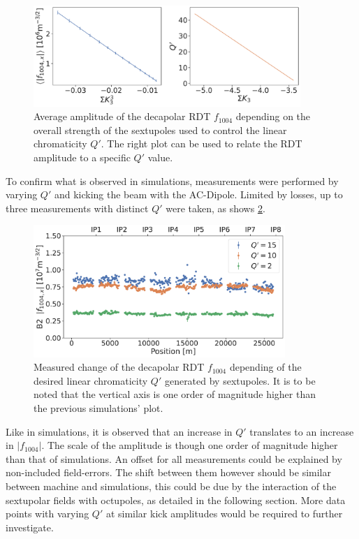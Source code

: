 \begin{figure}[!htb]
    \centering
    \includegraphics[width=0.9\textwidth]{./images/f1004/avg_f1004_k3.pdf}
    \caption{Average amplitude of the decapolar RDT $f_{1004}$ depending on the overall strength
    of the sextupoles used to control the linear chromaticity $Q'$. The right plot can be used
    to relate the RDT amplitude to a specific $Q'$ value.}
    \label{fig:decapoles:sextupoles_k3_f1004}
\end{figure}


To confirm what is observed in simulations, measurements were performed by varying $Q'$ and kicking
the beam with the AC-Dipole. Limited by losses, up to three measurements with distinct $Q'$ were
taken, as shows \cref{fig:decapoles:rdts:measured_f1004_from_sextupoles}.

\begin{figure}[!htb]
    \centering
    \includegraphics[width=0.85\textwidth]{./images/f1004/f1004x_q2_q10_q15.pdf}
    \caption{Measured change of the decapolar RDT $f_{1004}$ depending of the desired linear
    chromaticity $Q'$ generated by sextupoles. It is to be noted that the vertical axis is one
    order of magnitude higher than the previous simulations' plot.
    }
    \label{fig:decapoles:rdts:measured_f1004_from_sextupoles}
\end{figure}

Like in simulations, it is observed that an increase in $Q'$ translates to an increase in 
$|f_{1004}|$. The scale of the amplitude is though one order of magnitude higher than that of
simulations. An offset for all measurements could be explained by non-included field-errors. The
shift between them however should be similar between machine and simulations, this could be
due by the interaction of the sextupolar fields with octupoles, as detailed in the following
section. More data points with varying $Q'$ at similar kick amplitudes would be required to further
investigate.


